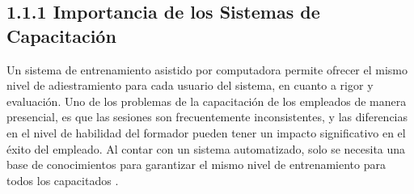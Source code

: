 \documentclass[12pt,a4paper]{report}
\begin{document}
\subsection*{1.1.1 Importancia de los Sistemas de Capacitación}
Un sistema de entrenamiento asistido por computadora permite ofrecer el mismo nivel de adiestramiento para cada usuario del sistema, en cuanto a rigor y evaluación. Uno de los problemas de la capacitación de los empleados de manera presencial, es que las sesiones son frecuentemente inconsistentes, y las diferencias en el nivel de habilidad del formador pueden tener un impacto significativo en el éxito del empleado. Al contar con un sistema automatizado, solo se necesita una base de conocimientos para garantizar el mismo nivel de entrenamiento para todos los capacitados \cite{cap2002}.

\nocite{*}


\end{document}

